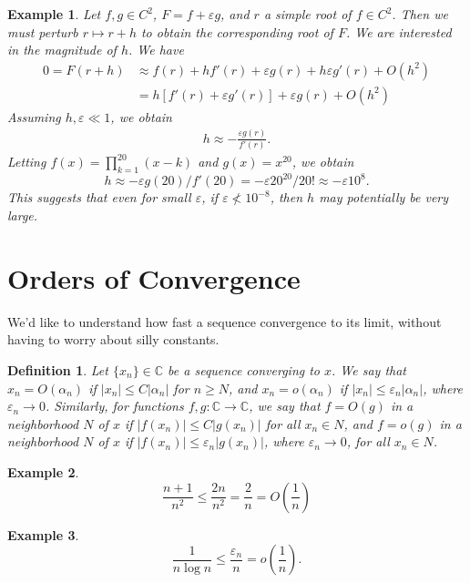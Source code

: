 \documentclass[12pt,reqno]{amsart}
\numberwithin{equation}{section}  %
\newcommand{\cc}{\mathbb{C}}
\newcommand{\ee}{\varepsilon}
\newtheorem*{definition}{Definition}
\newtheorem*{example}{Example}
\begin{document}
\begin{example}
Let $f, g \in C^2$, $F = f + \ee g$, and $r$ a simple root of $f \in C^2$.
Then we must perturb $r \mapsto r + h$ to obtain the corresponding
root of $F$. We are interested in the magnitude of $h$. We have
\begin{align*}
0 = F(r + h) & \approx f(r) + hf'(r) + \ee g(r) + h\ee g'(r) + O(h^2)
\\
& = h[f'(r)  + \ee g'(r)] + \ee g(r)  + O(h^2)
\end{align*}
Assuming $h, \ee \ll 1$, we obtain 
\begin{align*}
h \approx -\frac{\ee g(r)}{f'(r)}.
\end{align*}
Letting $f(x) = \prod_{k=1}^{20} (x-k)$ and $g(x) = x^{20}$, we obtain
\[h \approx -\ee g(20)/f'(20) = -\ee 20^20/20! \approx -\ee 10^8.\]
This suggests that even for small $\ee$, if $\ee \not < 10^{-8}$,
then $h$ may potentially be very large. 
\end{example}
\section{Orders of Convergence}
We'd like to understand how fast a sequence convergence to its limit, without
having to worry about silly constants.
\begin{definition}
Let $\{x_{n}\} \in \mathbb{C}$ be a sequence converging to $x$. We say that
$x_{n} = O(\alpha_{n})$ if $|x_{n}| \le C |\alpha_{n}|$  for $n \ge N$, and $ x_n 
= o(\alpha_n )$ if $|x_n| \le \ee_n |\alpha_n |$, where $\ee_n \to 0$.
Similarly, for functions $f,g: \cc \to \cc$, we say that $f = O(g)$ in a
neighborhood $N$ of $x$ if $|f(x_n) | \le C |g(x_n)|$ for all $x_n \in N$, and 
$f = o(g)$ in a neighborhood $N$ of $x$ if $|f(x_n) | \le \ee_n |g(x_n)|$,
where $\ee_n \to 0$,  for all $x_n \in N$.
\end{definition}

\begin{example}
\begin{equation*}
\frac{n+1}{n^2} \le \frac{2n}{n^2} = \frac{2}{n} = O\left(\frac{1}{n} \right)	
\end{equation*}
\end{example}
\begin{example}
\begin{equation*}
\frac{1}{n \log n} \le \frac{\ee_n}{n} = o\left(\frac{1}{n}\right).
\end{equation*}
\end{example}
\end{document}
